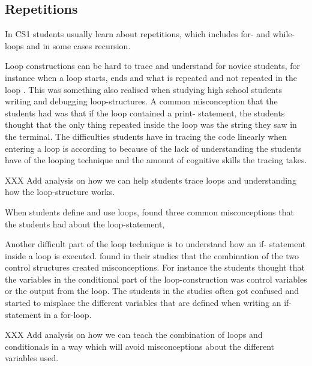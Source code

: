 \subsection{Repetitions}

In CS1 students usually learn about repetitions, which includes for- and 
while-loops and in some cases recursion.

Loop constructions can be hard to trace and understand for novice students, 
for instance when a loop starts, ends and what is repeated and not repeated 
in the loop \parencite{Sekiya2013,KumarVeerasamy2016,Kaczmarczyk2010}. This 
was something \textcite{Sleeman1984} also realised when studying high 
school students writing and debugging loop-structures. A common 
misconception that the students had was that if the loop contained a print-
statement, the students thought that the only thing repeated inside the 
loop was the string they saw in the terminal. The difficulties students 
have in tracing the code linearly when entering a loop is according to 
\textcite{KumarVeerasamy2016} because of the lack of understanding the 
students have of the looping technique and the amount of cognitive skills 
the tracing takes.

XXX Add analysis on how we can help students trace loops and understanding 
how the loop-structure works.

When students define and use loops, \textcite{GuoMarkelZhang2020} found 
three common misconceptions that the students had about the loop-statement, 


Another difficult part of the loop technique is to understand how an if-
statement inside a loop is executed. \textcite{Sekiya2013} found in their 
studies that the combination of the two control structures created 
misconceptions. For instance the students thought that the variables in the 
conditional part of the loop-construction was control variables or the 
output from the loop. The students in the studies often got confused and 
started to misplace the different variables that are defined when writing 
an if-statement in a for-loop.

XXX Add analysis on how we can teach the combination of loops and 
conditionals in a way which will avoid misconceptions about the different 
variables used. 